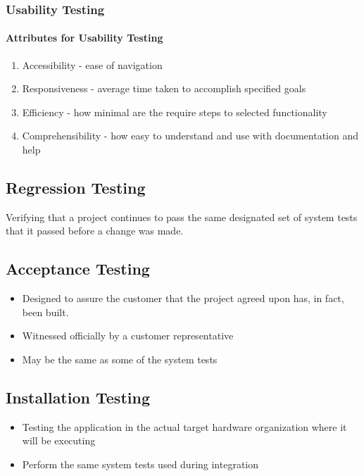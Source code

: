 \documentclass{report}
\begin{document}
				\subsubsection{Usability Testing}
					\paragraph{Attributes for Usability Testing} 
						\begin{enumerate}
							\item Accessibility - ease of navigation
							\item Responsiveness - average time taken to accomplish specified goals
							\item Efficiency - how minimal are the require steps to selected functionality
							\item Comprehensibility - how easy to understand and use with documentation and help
						\end{enumerate}
			\subsection{Regression Testing}
				Verifying that a project continues to pass the same designated set of system tests that it passed before a change was made.
			\subsection{Acceptance Testing}
				\begin{itemize}
					\item Designed to assure the customer that the project agreed upon has, in fact, been built.
					\item Witnessed officially by a customer representative
					\item May be the same as some of the system tests
				\end{itemize}
			\subsection{Installation Testing}
				\begin{itemize}
					\item Testing the application in the actual target hardware organization where it will be executing
					\item Perform the same system tests used during integration
				\end{itemize}
\end{document}
